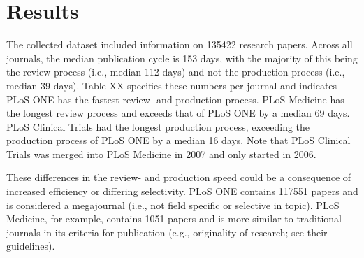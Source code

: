 \section*{Results}
The collected dataset included information on 135422 research papers. Across all journals, the median publication cycle is 153 days, with the majority of this being the review process (i.e., median 112 days) and not the production process (i.e., median 39 days). Table XX specifies these numbers per journal and indicates PLoS ONE has the fastest review- and production process. PLoS Medicine has the longest review process and exceeds that of PLoS ONE by a median 69 days. PLoS Clinical Trials had the longest production process, exceeding the production process of PLoS ONE by a median 16 days. Note that PLoS Clinical Trials was merged into PLoS Medicine in 2007 and only started in 2006.

These differences in the review- and production speed could be a consequence of increased efficiency or differing selectivity. PLoS ONE contains 117551 papers and is considered a megajournal (i.e., not field specific or selective in topic). PLoS Medicine, for example, contains 1051 papers and is more similar to traditional journals in its criteria for publication (e.g., originality of research; see their guidelines). 